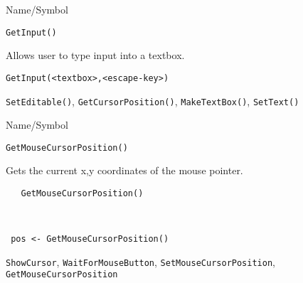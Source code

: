 \rl


\begin{desc}{Name/Symbol}
\item[Name/Symbol]	\verb+GetInput()+

\item[Description]	Allows user to type input into a textbox.

\item[Usage]
\begin{verbatim}
GetInput(<textbox>,<escape-key>)
\end{verbatim}

\item[Example]	

\item[See Also]	\verb+SetEditable()+, \verb+GetCursorPosition()+, \verb+MakeTextBox()+, \verb+SetText()+
\end{desc}

\rl

\begin{desc}{Name/Symbol}
\item[Name/Symbol]	\verb+GetMouseCursorPosition()+

\item[Description] Gets the current x,y coordinates of the mouse
  pointer.

\item[Usage]
\begin{verbatim}
   GetMouseCursorPosition()
\end{verbatim}

\item[Example]	
\begin{verbatim}


 pos <- GetMouseCursorPosition()
\end{verbatim}


\item[See Also]
  \verb+ShowCursor+, \verb+WaitForMouseButton+,
  \verb+SetMouseCursorPosition+, \verb+GetMouseCursorPosition+
\end{desc}

\rl


